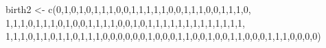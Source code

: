 \documentclass[
]{book}
\newenvironment{Shaded}{\begin{snugshade}}{\end{snugshade}}
\newcommand{\DecValTok}[1]{\textcolor[rgb]{0.00,0.00,0.81}{#1}}
\newcommand{\FunctionTok}[1]{\textcolor[rgb]{0.00,0.00,0.00}{#1}}
\newcommand{\NormalTok}[1]{#1}
\newcommand{\OtherTok}[1]{\textcolor[rgb]{0.56,0.35,0.01}{#1}}
\begin{document}
\begin{Shaded}
\begin{Highlighting}[]
\NormalTok{birth2 }\OtherTok{\textless{}{-}} \FunctionTok{c}\NormalTok{(}\DecValTok{0}\NormalTok{,}\DecValTok{1}\NormalTok{,}\DecValTok{0}\NormalTok{,}\DecValTok{1}\NormalTok{,}\DecValTok{0}\NormalTok{,}\DecValTok{1}\NormalTok{,}\DecValTok{1}\NormalTok{,}\DecValTok{1}\NormalTok{,}\DecValTok{0}\NormalTok{,}\DecValTok{0}\NormalTok{,}\DecValTok{1}\NormalTok{,}\DecValTok{1}\NormalTok{,}\DecValTok{1}\NormalTok{,}\DecValTok{1}\NormalTok{,}\DecValTok{1}\NormalTok{,}\DecValTok{0}\NormalTok{,}\DecValTok{0}\NormalTok{,}\DecValTok{1}\NormalTok{,}\DecValTok{1}\NormalTok{,}\DecValTok{1}\NormalTok{,}\DecValTok{0}\NormalTok{,}\DecValTok{0}\NormalTok{,}\DecValTok{1}\NormalTok{,}\DecValTok{1}\NormalTok{,}\DecValTok{1}\NormalTok{,}\DecValTok{0}\NormalTok{, }\DecValTok{1}\NormalTok{,}\DecValTok{1}\NormalTok{,}\DecValTok{1}\NormalTok{,}\DecValTok{0}\NormalTok{,}\DecValTok{1}\NormalTok{,}\DecValTok{1}\NormalTok{,}\DecValTok{1}\NormalTok{,}\DecValTok{0}\NormalTok{,}\DecValTok{1}\NormalTok{,}\DecValTok{0}\NormalTok{,}\DecValTok{0}\NormalTok{,}\DecValTok{1}\NormalTok{,}\DecValTok{1}\NormalTok{,}\DecValTok{1}\NormalTok{,}\DecValTok{1}\NormalTok{,}\DecValTok{0}\NormalTok{,}\DecValTok{0}\NormalTok{,}\DecValTok{1}\NormalTok{,}\DecValTok{0}\NormalTok{,}\DecValTok{1}\NormalTok{,}\DecValTok{1}\NormalTok{,}\DecValTok{1}\NormalTok{,}\DecValTok{1}\NormalTok{,}\DecValTok{1}\NormalTok{,}\DecValTok{1}\NormalTok{,}\DecValTok{1}\NormalTok{,}\DecValTok{1}\NormalTok{,}\DecValTok{1}\NormalTok{,}\DecValTok{1}\NormalTok{,}\DecValTok{1}\NormalTok{,}\DecValTok{1}\NormalTok{,}\DecValTok{1}\NormalTok{, }\DecValTok{1}\NormalTok{,}\DecValTok{1}\NormalTok{,}\DecValTok{1}\NormalTok{,}\DecValTok{0}\NormalTok{,}\DecValTok{1}\NormalTok{,}\DecValTok{1}\NormalTok{,}\DecValTok{0}\NormalTok{,}\DecValTok{1}\NormalTok{,}\DecValTok{1}\NormalTok{,}\DecValTok{0}\NormalTok{,}\DecValTok{1}\NormalTok{,}\DecValTok{1}\NormalTok{,}\DecValTok{1}\NormalTok{,}\DecValTok{0}\NormalTok{,}\DecValTok{0}\NormalTok{,}\DecValTok{0}\NormalTok{,}\DecValTok{0}\NormalTok{,}\DecValTok{0}\NormalTok{,}\DecValTok{0}\NormalTok{,}\DecValTok{1}\NormalTok{,}\DecValTok{0}\NormalTok{,}\DecValTok{0}\NormalTok{,}\DecValTok{0}\NormalTok{,}\DecValTok{1}\NormalTok{,}\DecValTok{1}\NormalTok{,}\DecValTok{0}\NormalTok{,}\DecValTok{0}\NormalTok{,}\DecValTok{1}\NormalTok{,}\DecValTok{0}\NormalTok{,}\DecValTok{0}\NormalTok{,}\DecValTok{1}\NormalTok{,}\DecValTok{1}\NormalTok{,}\DecValTok{0}\NormalTok{,}\DecValTok{0}\NormalTok{,}\DecValTok{0}\NormalTok{,}\DecValTok{1}\NormalTok{,}\DecValTok{1}\NormalTok{,}\DecValTok{1}\NormalTok{,}\DecValTok{0}\NormalTok{,}\DecValTok{0}\NormalTok{,}\DecValTok{0}\NormalTok{,}\DecValTok{0}\NormalTok{)}
\end{Highlighting}
\end{Shaded}
\end{document}
